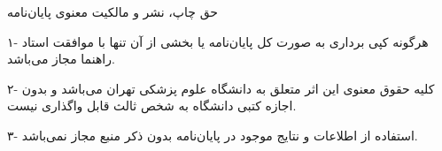 
\Titr\fontsize{14}{20}\selectfont حق چاپ، نشر و مالکیت معنوی پایان‌نامه
\par
\noindent
۱- هرگونه کپی برداری به صورت کل پایان‌نامه یا بخشی از آن تنها با موافقت استاد راهنما مجاز می‌باشد.
\par
\noindent
۲- کلیه حقوق معنوی این اثر متعلق به دانشگاه علوم پزشکی تهران می‌باشد و بدون اجازه کتبی دانشگاه به شخص ثالث قابل واگذاری نیست.
\par
\noindent
۳- استفاده از اطلاعات و نتایج موجود در پایان‌نامه بدون ذکر منبع مجاز نمی‌باشد.

\clearpage
